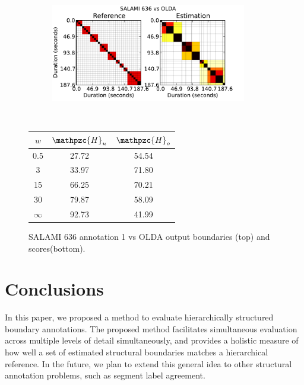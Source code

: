 \documentclass{article}
\def\shag{\ensuremath{\mathpzc{H}}}
\begin{document}
\begin{figure}[t]
  \centering
  \begin{subfigure}{0.5\textwidth}
    \centering
    \includegraphics[width=0.94\textwidth]{plots/SALAMI-OLDA.pdf}
  \end{subfigure}%
  \\
  \begin{minipage}{0.5\textwidth}
    \centering
    \vspace{10pt}
    \begin{tabular}{|c|c|c|}
      \hline
      $w$       & $\shag_u$       & $\shag_o$      \\
      \hline
      0.5       & 27.72       & 54.54      \\     
      3         & 33.97       & 71.80      \\
      15        & 66.25       & 70.21    \\
      30        & 79.87       & 58.09    \\
      $\infty$  & 92.73       & 41.99    \\
      \hline
    \end{tabular}
  \end{minipage}
  \caption{SALAMI 636 annotation 1 vs OLDA output boundaries (top) and scores(bottom).}
  \label{fig:SALAMI-OLDA}
\end{figure}




\section{Conclusions}\label{sec:conclusions}

In this paper, we proposed a method to evaluate hierarchically structured boundary annotations.  The proposed method facilitates simultaneous evaluation across multiple levels of
detail simultaneously, and provides a holistic measure of how well a set of estimated structural boundaries matches a hierarchical reference.  In the future, we plan to extend this
general idea to other structural annotation problems, such as segment label agreement.



%
\end{document}
